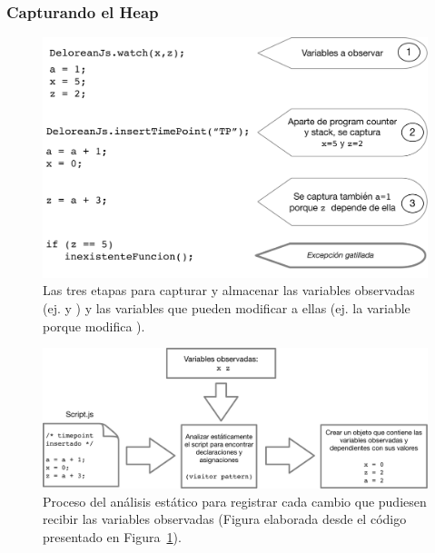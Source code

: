 \documentclass[conference]{IEEEtran}
\begin{document}
\smallskip

\subsubsection{Capturando el Heap}
\label{sec:heap}

\begin{figure}[t]
\begin{center}
\includegraphics[width=.9\linewidth]{fig-heap1}
\caption{Las tres etapas para capturar y almacenar las variables observadas (ej.  y ) y las variables que pueden modificar a ellas (ej. la variable  porque modifica ).}
\label{fig:heap1}
\end{center}
\end{figure}

\begin{figure}[t]
\begin{center}
\includegraphics[width=1.0\linewidth]{fig-heap2}
\caption{Proceso del an\'alisis est\'atico para registrar cada cambio que pudiesen recibir las variables observadas (Figura elaborada desde el c\'odigo presentado en Figura~\ref{fig:heap1}).}
\label{fig:heap2}
\end{center}
\end{figure}
\end{document}
